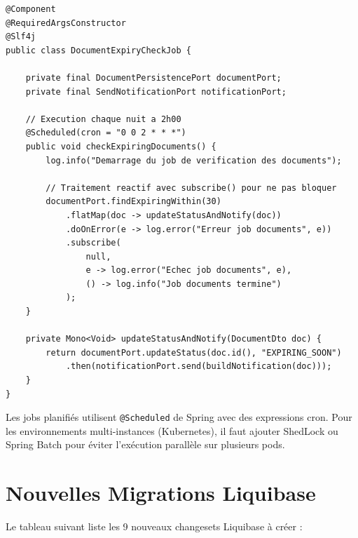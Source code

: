 \documentclass[12pt,a4paper]{report}
\begin{document}
\begin{lstlisting}[style=javaStyle, caption={Architecture d'un job planifié réactif}]
@Component
@RequiredArgsConstructor
@Slf4j
public class DocumentExpiryCheckJob {

    private final DocumentPersistencePort documentPort;
    private final SendNotificationPort notificationPort;

    // Execution chaque nuit a 2h00
    @Scheduled(cron = "0 0 2 * * *")
    public void checkExpiringDocuments() {
        log.info("Demarrage du job de verification des documents");

        // Traitement reactif avec subscribe() pour ne pas bloquer
        documentPort.findExpiringWithin(30)
            .flatMap(doc -> updateStatusAndNotify(doc))
            .doOnError(e -> log.error("Erreur job documents", e))
            .subscribe(
                null,
                e -> log.error("Echec job documents", e),
                () -> log.info("Job documents termine")
            );
    }

    private Mono<Void> updateStatusAndNotify(DocumentDto doc) {
        return documentPort.updateStatus(doc.id(), "EXPIRING_SOON")
            .then(notificationPort.send(buildNotification(doc)));
    }
}
\end{lstlisting}

\begin{notebox}
Les jobs planifiés utilisent \texttt{@Scheduled} de Spring avec des expressions cron. Pour les environnements multi-instances (Kubernetes), il faut ajouter ShedLock ou Spring Batch pour éviter l'exécution parallèle sur plusieurs pods.
\end{notebox}

\section{Nouvelles Migrations Liquibase}

Le tableau suivant liste les 9 nouveaux changesets Liquibase à créer :
\end{document}
